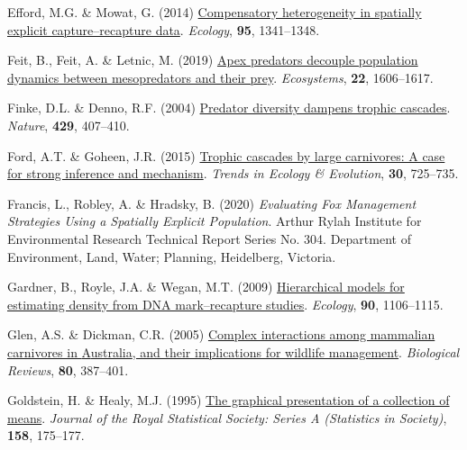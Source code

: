 \documentclass[preprint, 3p, authoryear]{elsarticle} %
\newlength{\cslhangindent}
\newlength{\cslentryspacingunit} %
\newenvironment{CSLReferences}[2] %
 {%
  \setlength{\parindent}{0pt}
  \ifodd #1
  \let\oldpar\par
  \def\par{\hangindent=\cslhangindent\oldpar}
  \fi
  \setlength{\parskip}{#2\cslentryspacingunit}
 }%
 {}
\begin{document}
\begin{CSLReferences}{1}{0}
\leavevmode{}%
Efford, M.G. \& Mowat, G. (2014) \href{https://doi.org/10.1890/13-1497.1}{Compensatory heterogeneity in spatially explicit capture--recapture data}. \emph{Ecology}, \textbf{95}, 1341--1348.

\leavevmode{}%
Feit, B., Feit, A. \& Letnic, M. (2019) \href{https://doi.org/10.1007/s10021-019-00360-2}{Apex predators decouple population dynamics between mesopredators and their prey}. \emph{Ecosystems}, \textbf{22}, 1606--1617.

\leavevmode{}%
Finke, D.L. \& Denno, R.F. (2004) \href{https://doi.org/10.1038/nature02554}{Predator diversity dampens trophic cascades}. \emph{Nature}, \textbf{429}, 407--410.

\leavevmode{}%
Ford, A.T. \& Goheen, J.R. (2015) \href{https://doi.org/10.1016/j.tree.2015.09.012}{Trophic cascades by large carnivores: A case for strong inference and mechanism}. \emph{Trends in Ecology \& Evolution}, \textbf{30}, 725--735.

\leavevmode{}%
Francis, L., Robley, A. \& Hradsky, B. (2020) \emph{Evaluating Fox Management Strategies Using a Spatially Explicit Population}. Arthur Rylah Institute for Environmental Research Technical Report Series No. 304. Department of Environment, Land, Water; Planning, Heidelberg, Victoria.

\leavevmode{}%
Gardner, B., Royle, J.A. \& Wegan, M.T. (2009) \href{https://doi.org/10.1890/07-2112.1}{Hierarchical models for estimating density from DNA mark--recapture studies}. \emph{Ecology}, \textbf{90}, 1106--1115.

\leavevmode{}%
Glen, A.S. \& Dickman, C.R. (2005) \href{https://doi.org/10.1017/S1464793105006718}{Complex interactions among mammalian carnivores in {{A}ustralia}, and their implications for wildlife management}. \emph{Biological Reviews}, \textbf{80}, 387--401.

\leavevmode{}%
Goldstein, H. \& Healy, M.J. (1995) \href{https://doi.org/10.2307/2983411}{The graphical presentation of a collection of means}. \emph{Journal of the Royal Statistical Society: Series A (Statistics in Society)}, \textbf{158}, 175--177.


\end{CSLReferences}
\end{document}

